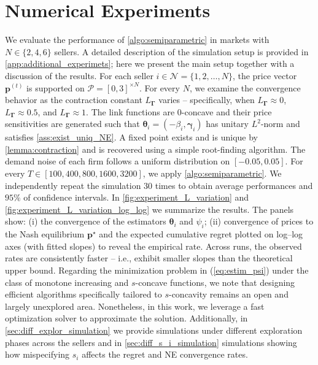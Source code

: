 \documentclass{article} %
\def\eqref#1{equation~\ref{#1}}
\renewcommand{\eqref}[1]{(\ref{#1})}
\begin{document}
\section{Numerical Experiments}\label{se:simulations}
We evaluate the performance of \cref{algo:semiparametric} in markets with $N \in \{2,4,6\}$ sellers. A detailed description of the simulation setup is provided in \cref{app:additional_experimets}; here we present the main setup together with a discussion of the results.  For each seller $i \in \mathcal{N}=\{1,2,\dots,N\}$, the price vector $\mathbf{p}^{(t)}$ is supported on $\mathcal{P}=[0,3]^{\times N}$. For every $N$, we examine the convergence behavior as the contraction constant $L_{\boldsymbol{\Gamma}}$ varies -- specifically, when $L_{\boldsymbol{\Gamma}} \approx 0$, $L_{\boldsymbol{\Gamma}} \approx 0.5$, and $L_{\boldsymbol{\Gamma}} \approx 1$. The link functions are $0$-concave and their price sensitivities are generated such that $\boldsymbol{\theta}_i = (-\beta_i,\boldsymbol{\gamma}_i)$ has unitary $L^2$-norm and satisfies \cref{ass:exist_uniq_NE}. A fixed point exists and is unique by \cref{lemma:contraction} and is recovered using a simple root-finding algorithm. The demand noise of each firm follows a uniform distribution on $[-0.05,0.05]$. For every $T \in [100, 400, 800, 1600, 3200]$, we apply \cref{algo:semiparametric}. We independently repeat the simulation $30$ times to obtain average performances and $95 \%$ of confidence intervals. In \cref{fig:experiment_L_variation} and \cref{fig:experiment_L_variation_log_log} we summarize the results. The panels show: (i) the convergence of the estimators \(\boldsymbol{\theta}_i\) and \(\psi_i\); (ii) convergence of prices to the Nash equilibrium \(\mathbf{p}^\star\) and the expected cumulative regret plotted on log–log axes (with fitted slopes) to reveal the empirical rate. Across runs, the observed rates are consistently faster -- i.e., exhibit smaller slopes than the theoretical upper bound. Regarding the minimization problem in \eqref{eq:estim_psi} under the class of monotone increasing and $s$-concave functions, we note that designing efficient algorithms specifically tailored to $s$-concavity remains an open and largely unexplored area. Nonetheless, in this work, we leverage a fast optimization solver to approximate the solution. Additionally, in \cref{sec:diff_explor_simulation} we provide simulations under different exploration phases across the sellers and in \cref{sec:diff_s_i_simulation} simulations showing how mispecifying $s_i$ affects the regret and NE convergence rates. 
\end{document}
